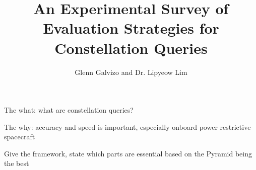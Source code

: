 \documentclass[11pt]{beamer}
\author{Glenn Galvizo and Dr. Lipyeow Lim}
\title{An Experimental Survey of Evaluation Strategies for Constellation Queries}
\institute{University of Hawaii at Manoa}
\begin{document}
    \begin{frame}
        \titlepage
    \end{frame}


	\begin{frame}
		The what: what are constellation queries?
	\end{frame}
	
	\begin{frame}
		The why: accuracy and speed is important, especially onboard power restrictive spacecraft 
	\end{frame}
	
	\begin{frame}
		Give the framework, state which parts are essential based on the Pyramid being the best
	\end{frame}
	
    \begin{frame}
    \end{frame}
\end{document}
